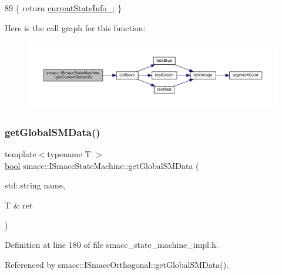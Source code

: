 \begin{DoxyCode}
89 \{ \textcolor{keywordflow}{return} \hyperlink{classsmacc_1_1ISmaccStateMachine_a95e42f735cecdc231ad5372bf9fe7eaf}{currentStateInfo\_}; \}
\end{DoxyCode}
Here is the call graph for this function\+:
\nopagebreak
\begin{figure}[H]
\begin{center}
\leavevmode
\includegraphics[width=350pt]{classsmacc_1_1ISmaccStateMachine_a4738679e8e5f7adab35e610dce0bfff7_cgraph}
\end{center}
\end{figure}
\mbox{\label{classsmacc_1_1ISmaccStateMachine_aeda2d6813c6c428bf318a5792e014b61}} 
\subsubsection{\texorpdfstring{get\+Global\+S\+M\+Data()}{getGlobalSMData()}}
{\footnotesize\ttfamily template$<$typename T $>$ \\
\hyperlink{classbool}{bool} smacc\+::\+I\+Smacc\+State\+Machine\+::get\+Global\+S\+M\+Data (\begin{DoxyParamCaption}\item[{std\+::string}]{name,  }\item[{T \&}]{ret }\end{DoxyParamCaption})}



Definition at line 180 of file smacc\+\_\+state\+\_\+machine\+\_\+impl.\+h.



Referenced by smacc\+::\+I\+Smacc\+Orthogonal\+::get\+Global\+S\+M\+Data().


